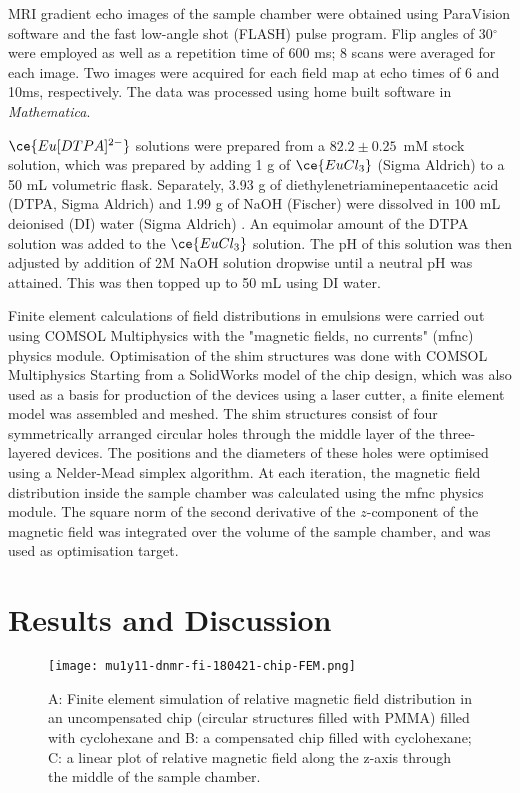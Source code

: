 MRI gradient echo images of the sample chamber were obtained using ParaVision software
and the fast low-angle shot (FLASH) pulse program. Flip angles of 30$^\circ$ were employed as
 well as a repetition time of 600 ms; 8 scans were averaged for each image. Two images were
 acquired for each field map at echo times of 6 and 10ms, respectively. The data was processed
 using home built software in \textit{Mathematica}.

$\ce{Eu[DTPA]^{2-}}$ solutions were prepared  from a $82.2\pm0.25$~mM
stock solution, which was prepared by adding 1 g of $\ce{EuCl_3}$
(Sigma Aldrich) to a 50 mL volumetric flask. Separately,
3.93 g of diethylenetriaminepentaacetic acid (DTPA, Sigma Aldrich)
and 1.99 g of NaOH (Fischer) were dissolved in 100 mL deionised (DI) water (Sigma Aldrich) .
An equimolar amount of the DTPA solution was added to the $\ce{EuCl_3}$ solution. The pH of this solution was then adjusted by addition of 2M NaOH solution dropwise until a neutral pH was attained.
This was then topped up to 50 mL using DI water.

Finite element calculations of field distributions in emulsions
were carried out using COMSOL Multiphysics with the "magnetic fields, no currents" (mfnc) physics module.
Optimisation of the shim structures was done with COMSOL Multiphysics \citep{comsolmp} Starting from a SolidWorks model
of the chip design, which was also used as a basis for production of the devices using
a laser cutter, a finite element model was assembled and meshed. The shim structures consist
of four symmetrically arranged circular holes through the middle layer of the three-layered
devices. The positions and the diameters of these
holes were optimised using a Nelder-Mead simplex algorithm. At each iteration, the magnetic
field distribution inside the sample chamber was calculated using the mfnc physics module.
The square norm of the second derivative of the $z$-component of the magnetic field was integrated
over the volume of the sample chamber, and was used as optimisation target.


\section{Results and Discussion}

\begin{figure}
  \begin{center}
    \texttt{[image: mu1y11-dnmr-fi-180421-chip-FEM.png]}
  \end{center}
  \caption{A: Finite element simulation of relative magnetic field distribution in an uncompensated chip (circular structures filled with PMMA) filled with cyclohexane
      and B: a compensated chip filled with cyclohexane; C: a linear plot of relative magnetic field along the z-axis through the middle of the sample chamber.
    }
  \label{fig:FEM-chip}
\end{figure}

